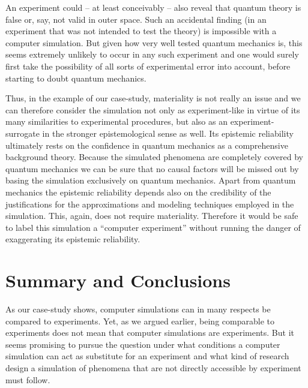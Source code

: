 \documentclass[12pt, a4paper]{article}
\numberwithin{equation}{section}
\begin{document}
An experiment could -- at least conceivably -- also reveal that quantum
theory is false or, say, not valid in outer space. Such an accidental
finding (in an experiment that was not intended to test the theory) is
impossible with a computer simulation. But given how very well tested
quantum mechanics is, this seems extremely unlikely to occur in any such
experiment and one would surely first take the possibility of all sorts
of experimental error into account, before starting to doubt quantum
mechanics.

Thus, in the example of our case-study, materiality is not really an
issue and we can therefore consider the simulation not only as
experiment-like in virtue of its many similarities to experimental
procedures, but also as an experiment-surrogate in the stronger
epistemological sense as well. Its epistemic reliability ultimately
rests on the confidence in quantum mechanics as a comprehensive
background theory. Because the simulated phenomena are completely
covered by quantum mechanics we can be sure that no causal factors
will be missed out by basing the simulation exclusively on quantum
mechanics. Apart from quantum mechanics the epistemic reliability
depends also on the credibility of the justifications for the
approximations and modeling techniques employed in the
simulation. This, again, does not require materiality.  Therefore it
would be safe to label this simulation a ``computer experiment''
without running the danger of exaggerating its epistemic reliability.



\section{Summary and Conclusions}

As our case-study shows, computer simulations can in many respects be
compared to experiments. Yet, as we argued earlier, being comparable
to experiments does not mean that computer simulations are
experiments. But it seems promising to pursue the question under what
conditions a computer simulation can act as substitute for an
experiment and what kind of research design a simulation of phenomena
that are not directly accessible by experiment must follow.
\end{document}
